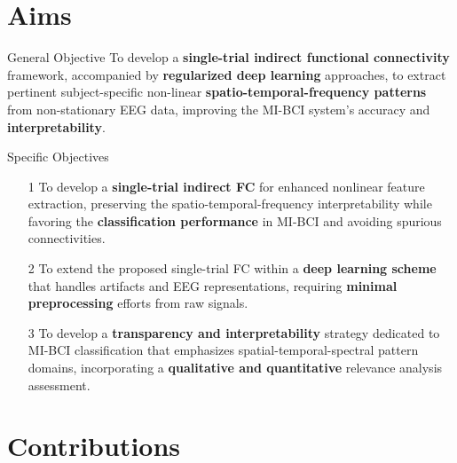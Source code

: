 \documentclass[aspectratio=169]{beamer}
\begin{document}
\section{Aims}

\begin{frame}{General Objective}
    \centering
    To develop a \textbf{single-trial indirect functional connectivity} framework, accompanied by \textbf{regularized deep learning} approaches, to extract pertinent subject-specific non-linear \textbf{spatio-temporal-frequency patterns} from non-stationary EEG data, improving the MI-BCI system's accuracy and \textbf{interpretability}.
\end{frame}

\begin{frame}{Specific Objectives}
\centering
\begin{itemize}
    \setlength\itemsep{2em}
	\item[1] To develop a \textbf{single-trial indirect FC} for enhanced nonlinear feature extraction, preserving the spatio-temporal-frequency interpretability while favoring the \textbf{classification performance} in MI-BCI and avoiding spurious connectivities.
 
	\item[2] To extend the proposed single-trial FC within a \textbf{deep learning scheme} that handles artifacts and EEG representations, requiring \textbf{minimal preprocessing} efforts from raw signals.
 
	\item[3] To develop a \textbf{transparency and interpretability} strategy dedicated to MI-BCI classification that emphasizes spatial-temporal-spectral pattern domains, incorporating a \textbf{qualitative and quantitative} relevance analysis assessment.
\end{itemize}
\end{frame}

\section{Contributions}
\end{document}
